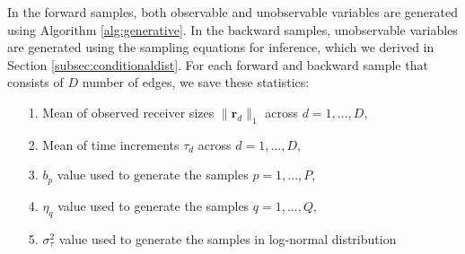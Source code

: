 \documentclass[ba]{imsart}
\numberwithin{equation}{section}
\theoremstyle{plain}
\begin{document}
   In the forward samples, both observable and unobservable variables are generated using Algorithm \ref{alg:generative}. In the backward samples, unobservable variables are generated using the sampling equations for inference, which we derived in Section \ref{subsec:conditionaldist}. For each forward and backward sample that consists of $D$ number of edges, we save these statistics:
   \begin{itemize}
   	\item[1.] Mean of observed receiver sizes $ \lVert \boldsymbol{r}_{d} \rVert_1 $ across $d=1,\ldots,D$,
   	\item[2.] Mean of time increments $\tau_d$ across $d=1,...,D$,
   	\item[3.] $b_p$ value used to generate the samples $p = 1,...,P$,
   	\item[4.] $\eta_q$ value used to generate the samples $q = 1,...,Q$,
   	\item[5.] $\sigma^2_\tau$ value used to generate the samples in log-normal distribution
   \end{itemize}
   
\end{document}
